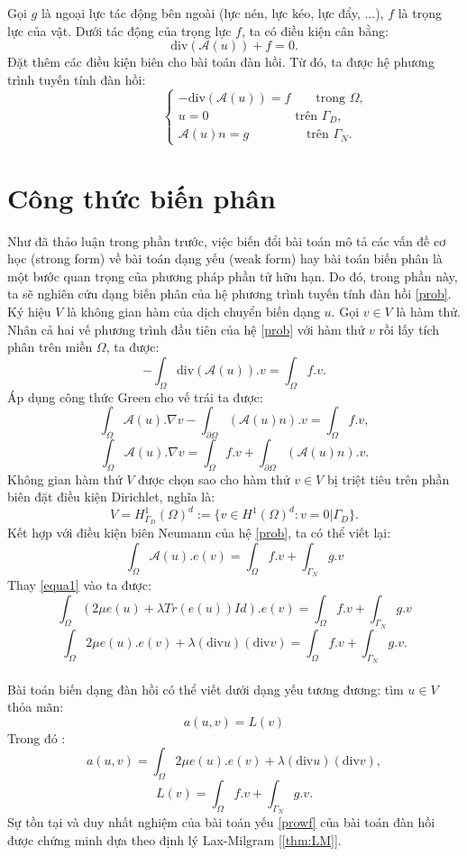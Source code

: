 \documentclass[
12pt, %
oneside, %
english, %
onehalfspacing, %
nolistspacing, %
headsepline, %
addchap,
]{MastersDoctoralThesis} %
\begin{document}
Gọi $g$ là ngoại lực tác động bên ngoài (lực nén, lực kéo, lực đẩy, ...), $f$ là trọng lực của vật. Dưới tác động của trọng lực $f$, ta có điều kiện cân bằng: 
\begin{equation}\label{gravi}
\text{div}(\mathcal{A}(u)) + f = 0.
\end{equation}
Đặt thêm các điều kiện biên cho bài toán đàn hồi. Từ đó, ta được hệ phương trình tuyến tính đàn hồi:
\begin{equation}\label{prob}
\quad\quad\quad\quad\quad
\begin{cases}
-\text{div}(\mathcal{A}(u)) = f \qquad \text{trong } \Omega,\\
u = 0 \quad\qquad\quad\qquad\;\;\; \text{trên } \Gamma_D, \\
\mathcal{A}(u)n = g \qquad\qquad\;\; \text{trên } \Gamma_N.
\end{cases}
\end{equation}

\section{Công thức biến phân}\label{sec:chap1_characteristicMethod}
Như đã thảo luận trong phần trước, việc biến đổi bài toán mô tả các vấn đề cơ học (strong form) về bài toán dạng yếu (weak form) hay bài toán biến phân là một bước quan trọng của phương pháp phần tử hữu hạn. Do đó, trong phần này, ta sẽ nghiên cứu dạng biến phân của hệ phương trình tuyến tính đàn hồi \eqref{prob}.\\

Ký hiệu $V$ là không gian hàm của dịch chuyển biến dạng $u$. Gọi $v \in V$ là hàm thử. Nhân cả hai vế phương trình đầu tiên của hệ \eqref{prob} với hàm thử $v$ rồi lấy tích phân trên miền $\Omega$, ta được:
$$-\int_\Omega\text{div}(\mathcal{A}(u)).v = \int_\Omega f.v.$$
Áp dụng công thức Green cho vế trái ta được:
$$\int_\Omega\mathcal{A}(u).\nabla v - \int_{\partial \Omega}(\mathcal{A}(u)n).v = \int_\Omega f.v,$$
$$\int_\Omega\mathcal{A}(u).\nabla v = \int_\Omega f.v + \int_{\partial \Omega}(\mathcal{A}(u)n).v.$$
Không gian hàm thử $V$ được chọn sao cho hàm thử $v \in V$ bị triệt tiêu trên phần biên đặt điều kiện Dirichlet, nghĩa là:
$$V = H^1_{\Gamma_D}(\Omega)^d := \{v \in H^1(\Omega)^d : v = 0|\Gamma_D\}.$$
Kết hợp với điều kiện biên Neumann của hệ \eqref{prob}, ta có thể viết lại:
$$\int_\Omega\mathcal{A}(u).e(v) = \int_\Omega f.v + \int_{\Gamma_N}g.v$$
Thay \eqref{equa1} vào ta được:
$$\int_\Omega(2\mu e(u) + \lambda Tr(e(u))Id).e(v) = \int_\Omega f.v + \int_{\Gamma_N}g.v$$
$$\int_\Omega 2\mu e(u) . e(v) + \lambda(\text{div}u)(\text{div}v) = \int_\Omega f.v + \int_{\Gamma_N}g.v.$$\\
Bài toán biến dạng đàn hồi có thể viết dưới dạng yếu tương đương: tìm $u\in V$ thỏa mãn:
\begin{equation}\label{prowf}
a(u,v) = L(v)
\end{equation}
Trong đó :
$$a(u,v) = \int_\Omega 2\mu e(u) . e(v) + \lambda(\text{div}u)(\text{div}v),$$
$$L(v) = \int_\Omega f.v + \int_{\Gamma_N}g.v.$$
Sự tồn tại và duy nhất nghiệm của bài toán yếu \ref{prowf} của bài toán đàn hồi được chứng minh dựa theo định lý Lax-Milgram [\ref{thm:LM}].
\end{document}
